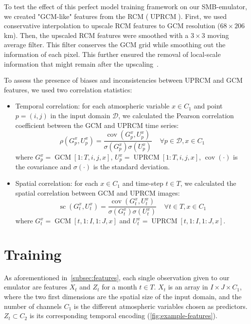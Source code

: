 \documentclass[a4paper,11pt,oneside]{report}
\begin{document}
To test the effect of this perfect model training framework on our SMB-emulator, we created "GCM-like" features from the RCM ($\operatorname{UPRCM}$). First, we used conservative interpolation to upscale RCM features to GCM resolution ($68\times206$ km). Then, the upscaled RCM features were smoothed with a $3\times3$ moving average filter. This filter conserves the GCM grid while smoothing out the information of each pixel. This further ensured the removal of local-scale information that might remain after the upscaling~\cite{Doury, Klaver2020}.


To assess the presence of biases and inconsistencies between UPRCM and GCM features, we used two correlation statistics:  
\begin{itemize}
        \item Temporal correlation: for each atmospheric variable $x\in C_1$ and point $p = (i,j)$ in the input domain $\mathcal{D}$, we calculated the Pearson correlation coefficient between the GCM and UPRCM time series:
        \begin{equation}\label{eq:temporal-corr}
            \rho\left(G_{p}^x,U_{p}^x\right) = \frac{\operatorname{cov}(G_{p}^x,U_{p}^x)}{\sigma(G_{p}^x)\sigma(U_{p}^x)} \;\;\;\; \forall p \in \mathcal{D}, x\in C_1 
        \end{equation}
        where $G_{p}^x = \operatorname{GCM}[1:T, i, j, x]$, $U_{p}^x = \operatorname{UPRCM}[1:T, i, j, x]$, $\operatorname {cov}(\cdot)$  is the covariance and  $\sigma(\cdot)$ is the standard deviation.  
        \item Spatial correlation: for each $x\in C_1$ and time-step $t \in T$, we calculated the spatial correlation between GCM and UPRCM images: 
        \begin{equation}\label{eq:spatial-corr}
            \operatorname{sc}\left(G_{t}^x,U_{t}^x\right) = \frac{\operatorname{cov}(G_{t}^x,U_{t}^x)}{\sigma(G_{t}^x)\sigma(U_{t}^x)} \;\;\;\; \forall t \in T, x\in C_1 
        \end{equation}
        where $G_{t}^x = \operatorname{GCM}[t,1:I,1:J,x]$ and $U_{t}^x =\operatorname{UPRCM}[t,1:I,1:J,x]$. 
    \end{itemize}


\section{Training}\label{subsec:training}
As aforementioned in~\autoref{subsec:features}, each single observation given to our emulator are features $X_t$ and $Z_t$ for a month $t\in T$. $X_t$ is an array in $I \times J \times C_1$, where the two first dimensions are the spatial size of the input domain, and the number of channels $C_1$ is the different atmospheric variables chosen as predictors. $Z_t \subset C_2$ is its corresponding temporal encoding (\autoref{fig:example-features}).
\end{document}
